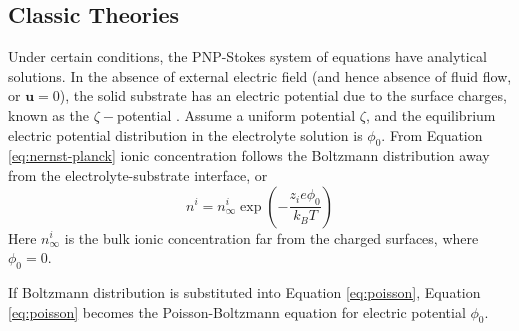 %

\subsection{Classic Theories}
Under certain conditions, the PNP-Stokes system of equations have analytical solutions. In the absence of external electric field (and hence absence of fluid flow, or $\mathbf{u}=0$), the solid substrate has an electric potential due to the surface charges, known as the $\zeta-$potential \cite{kirby2004zeta,kirby2004zeta2}. Assume a uniform potential $\zeta$, and the equilibrium electric potential distribution in the electrolyte solution is $\phi_0$. From Equation \ref{eq:nernst-planck} ionic concentration follows the Boltzmann distribution away from the electrolyte-substrate interface, or
\begin{equation}
n^i = n_\infty^i \exp \left( -\frac{z_i e \phi_0}{k_BT} \right)
\end{equation}
Here $n_\infty^i$ is the bulk ionic concentration far from the charged surfaces, where $\phi_0=0$.

If Boltzmann distribution is substituted into Equation \ref{eq:poisson}, Equation \ref{eq:poisson} becomes the Poisson-Boltzmann equation for electric potential $\phi_0$. 

